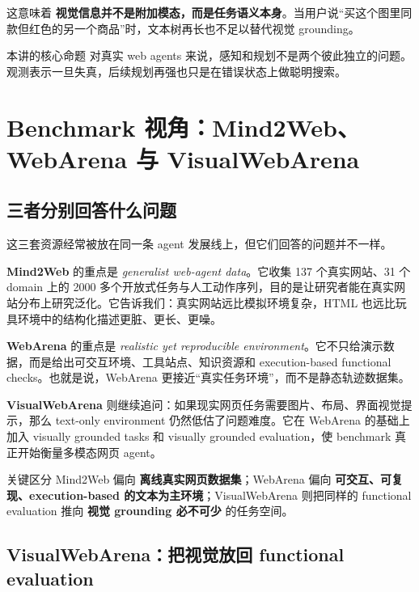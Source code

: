 \documentclass[a4paper]{article}
\begin{document}
这意味着 \textbf{视觉信息并不是附加模态，而是任务语义本身}。当用户说“买这个图里同款但红色的另一个商品”时，文本树再长也不足以替代视觉 grounding。

\begin{knowledgebox}{本讲的核心命题}
对真实 web agents 来说，感知和规划不是两个彼此独立的问题。观测表示一旦失真，后续规划再强也只是在错误状态上做聪明搜索。
\end{knowledgebox}

\section{Benchmark 视角：Mind2Web、WebArena 与 VisualWebArena}

\subsection{三者分别回答什么问题}

这三套资源经常被放在同一条 agent 发展线上，但它们回答的问题并不一样。

\textbf{Mind2Web} 的重点是 \emph{generalist web-agent data}。它收集 137 个真实网站、31 个 domain 上的 2000 多个开放式任务与人工动作序列，目的是让研究者能在真实网站分布上研究泛化。它告诉我们：真实网站远比模拟环境复杂，HTML 也远比玩具环境中的结构化描述更脏、更长、更噪。

\textbf{WebArena} 的重点是 \emph{realistic yet reproducible environment}。它不只给演示数据，而是给出可交互环境、工具站点、知识资源和 execution-based functional checks。也就是说，WebArena 更接近“真实任务环境”，而不是静态轨迹数据集。

\textbf{VisualWebArena} 则继续追问：如果现实网页任务需要图片、布局、界面视觉提示，那么 text-only environment 仍然低估了问题难度。它在 WebArena 的基础上加入 visually grounded tasks 和 visually grounded evaluation，使 benchmark 真正开始衡量多模态网页 agent。

\begin{importantbox}{关键区分}
Mind2Web 偏向 \textbf{离线真实网页数据集}；WebArena 偏向 \textbf{可交互、可复现、execution-based 的文本为主环境}；VisualWebArena 则把同样的 functional evaluation 推向 \textbf{视觉 grounding 必不可少} 的任务空间。
\end{importantbox}

\subsection{VisualWebArena：把视觉放回 functional evaluation}
\end{document}
